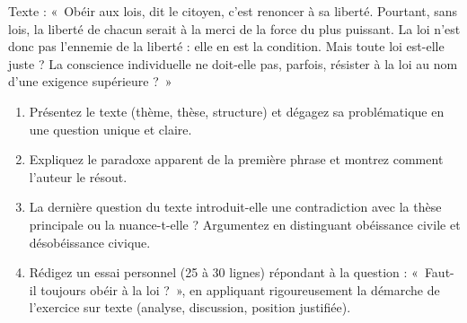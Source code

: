\documentclass[11pt]{article}
\begin{document}
\begin{exercice}
Texte : «~Obéir aux lois, dit le citoyen, c'est renoncer à sa liberté. Pourtant, sans lois, la liberté de chacun serait à la merci de la force du plus puissant. La loi n'est donc pas l'ennemie de la liberté : elle en est la condition. Mais toute loi est-elle juste ? La conscience individuelle ne doit-elle pas, parfois, résister à la loi au nom d'une exigence supérieure ?~»
\begin{enumerate}
\item Présentez le texte (thème, thèse, structure) et dégagez sa problématique en une question unique et claire.
\item Expliquez le paradoxe apparent de la première phrase et montrez comment l'auteur le résout.
\item La dernière question du texte introduit-elle une contradiction avec la thèse principale ou la nuance-t-elle ? Argumentez en distinguant obéissance civile et désobéissance civique.
\item Rédigez un essai personnel (25 à 30 lignes) répondant à la question : «~Faut-il toujours obéir à la loi ?~», en appliquant rigoureusement la démarche de l'exercice sur texte (analyse, discussion, position justifiée).
\end{enumerate}
\end{exercice}
\end{document}
